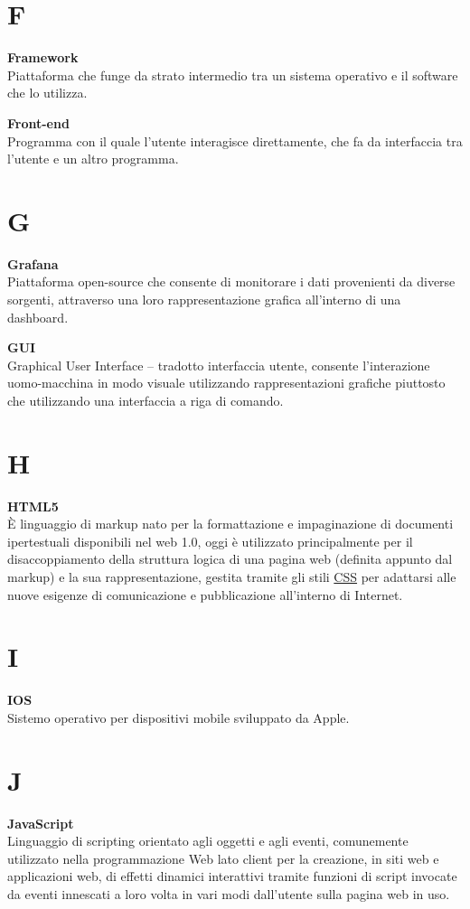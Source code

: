 \documentclass[a4paper, oneside, openany, dvipsnames, table, 12pt]{article}
\begin{document}
\newpage
\section{F}
\textbf{Framework} \\
Piattaforma che funge da strato intermedio tra un sistema operativo e il software che lo utilizza.

\textbf{Front-end} \\
Programma con il quale l’utente interagisce direttamente, che fa da interfaccia tra l’utente e un altro programma.

\newpage
\section{G}
\textbf{Grafana} \\
Piattaforma open-source che consente di monitorare i dati provenienti da diverse sorgenti, attraverso una loro rappresentazione grafica all'interno di una
dashboard.

\textbf{GUI} \\
Graphical User Interface – tradotto interfaccia utente, consente l’interazione uomo-macchina in modo visuale utilizzando rappresentazioni grafiche piuttosto che utilizzando una interfaccia a riga di comando.

\newpage
\section{H}
\textbf{HTML5}\\	
\`E linguaggio di markup nato per la formattazione e impaginazione di documenti ipertestuali disponibili nel web 1.0, oggi è utilizzato principalmente per il disaccoppiamento della struttura logica di una pagina web (definita appunto dal markup) e la sua rappresentazione, gestita tramite gli stili \hyperref[par:css3]{CSS} per adattarsi alle nuove esigenze di comunicazione e pubblicazione all'interno di Internet.

\newpage
\section{I}
\textbf{IOS} \\
Sistemo operativo per dispositivi mobile sviluppato da Apple.

\newpage
\section{J}
\textbf{JavaScript}\\	
Linguaggio di scripting orientato agli oggetti e agli eventi, comunemente utilizzato nella programmazione Web lato client per la creazione, in siti web e applicazioni web, di effetti dinamici interattivi tramite funzioni di script invocate da eventi innescati a loro volta in vari modi dall'utente sulla pagina web in uso.
\end{document}
